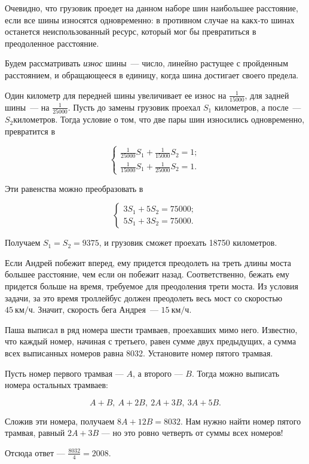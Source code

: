 ﻿
\begin{itemize}

\itA Очевидно, что грузовик проедет на данном наборе шин наибольшее расстояние, если все шины износятся одновременно: в противном случае на какх-то шинах останется неиспользованный ресурс, который мог бы превратиться в преодоленное расстояние.

Будем рассматривать {\itshape износ} шины~— число, линейно растущее с пройденным расстоянием, и обращающееся в единицу, когда шина достигает своего предела.

Один километр для передней шины увеличивает ее износ на $\tfrac{1}{15000}$, для задней шины~— на $\tfrac{1}{25000}$. Пусть до замены грузовик проехал $S_1$ километров, а после~— $S_2 километров$. Тогда условие о том, что две пары шин износились одновременно, превратится в

$$
\begin{cases}
	\frac{1}{25000}S_1 + \frac{1}{15000}S_2 = 1; \\
	\frac{1}{15000}S_1 + \frac{1}{25000}S_2 = 1.
\end{cases}
$$

Эти равенства можно преобразовать в

$$
\begin{cases}
	3S_1 + 5S_2 = 75000; \\
	5S_1 + 3S_2 = 75000.
\end{cases}
$$

Получаем $S_1 = S_2 = 9375$, и грузовик сможет проехать 18750 километров.


\itB Если Андрей побежит вперед, ему придется преодолеть на треть длины моста большее расстояние, чем если он побежит назад. Соответственно, бежать ему придется больше на время, требуемое для преодоления трети моста. Из условия задачи, за это время троллейбус должен преодолеть весь мост со скоростью $\SI{45}{\text{км}/\text{ч}}$. Значит, скорость бега Андрея~— $\SI{15}{\text{км}/\text{ч}}$.

\itC Паша выписал в ряд номера шести трамваев, проехавших мимо него. Известно, что каждый номер, начиная с третьего, равен сумме двух предыдущих, а сумма всех выписанных номеров равна 8032. Установите номер пятого трамвая.

Пусть номер первого трамвая — $A$, а второго — $B$. Тогда можно выписать номера остальных трамваев:

$$A+B,\ A+2B,\ 2A+3B,\ 3A+5B.$$

Сложив эти номера, получаем $8A + 12B = 8032$. Нам нужно найти номер пятого трамвая, равный $2A+3B$ — но это ровно четверть от суммы всех номеров!

Отсюда ответ — $\tfrac{8032}{4} = 2008.$
\end{itemize}